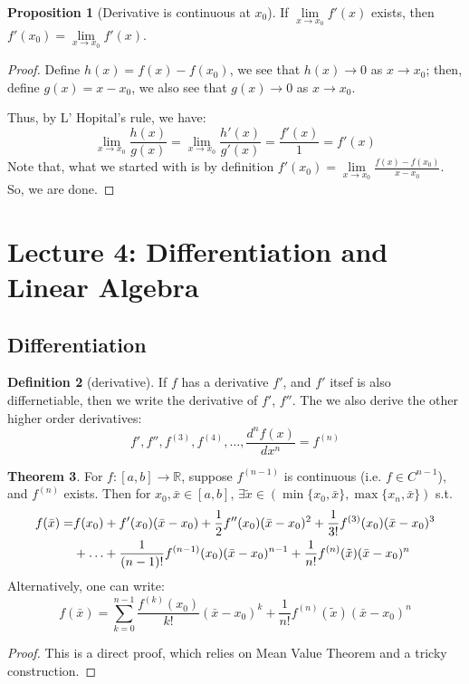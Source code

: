 \documentclass[12pt]{article}
\newcommand{\R}{{\mathbb R}}
\theoremstyle{definition}
\newtheorem{theorem}{Theorem}[section]
\newtheorem{definition}[theorem]{Definition}
\newtheorem{proposition}[theorem]{Proposition}
\theoremstyle{plain}
\begin{document}
\begin{proposition}
    [Derivative is continuous at $x_0$]
    If $\underset{x \to x_0} \lim f'(x)$ exists, then $f'(x_0) = \underset{x \to 
    x_0} \lim
    f'(x)$.

    \begin{proof}
        Define $h(x) = f(x) - f(x_0)$, we see that $h(x) \to 0$ as $x \to x_0$; 
        then, define $g(x) = x - x_0$, we also see that $g(x) \to 0$ as $x \to 
        x_0$. 
        
        Thus, by L' Hopital's rule, we have: 
        \[
            \underset{x \to x_0} \lim \frac{h(x)}{g(x)} = \underset{x \to x_0}  
            \lim
            \frac{h'(x)}{g'(x)} = \frac{f'(x)}{ 1} = f'(x)
        \]
        Note that, what we started with is by definition $f'(x_0) = \underset{x 
        \to x_0} \lim \frac{f(x) - f(x_0)}{ x - x_0}$. So, we are done.
    \end{proof}
\end{proposition}

\section{Lecture 4: Differentiation and Linear Algebra}

\subsection{Differentiation}

\begin{definition}
    [derivative]
    If $f$ has a derivative $f'$, and $f'$ itsef is also differnetiable, then we 
    write the derivative of $f'$, $f''$. The we also derive the other higher 
    order derivatives: 
    \[
        f', f'', f^{(3)}, f^{(4)}, \ldots, \frac{d ^n f(x)}{d x^n} = f^{(n)}
    \]
\end{definition}

\begin{theorem}
    For $f:[a,b] \to \R$, suppose $f^{(n-1)}$ is continuous (i.e. $f\in 
    C^{n-1}$), and $f^{(n)}$ exists. Then for $x_0, \bar x \in [a,b]$, $\exists 
    \tilde x \in \left( \min\{x_0, \bar x\}, \max \{ x_n, \bar x \} \right)$ 
    s.t. 
    \[
        \aligned
        f(\bar x ) = & f(x_0) + f'(x_0) ( \bar  x- x_0) + \frac{1}{2} f''(x_0) 
        (\bar x - x_0)^2 + \frac{1}{3!} f^{(3)} (x_0) (\bar x - x_0)^3 \\
        & + \ldots  + \frac{1}{(n-1)!} f^{(n-1)} (x_0) (\bar x - x_0) ^ {n-1} + 
        \frac{1}{n!} f^{(n)}(\tilde x)(\bar x - x_0)^n
        \endaligned
    \]
    Alternatively, one can write: 
    \[
        f(\bar x) = \sum_{k=0}^{n-1} \frac{f^{(k)}(x_0)}{k!}(\bar x - x_0)^k + 
        \frac{1}{n!}f^{(n)}(\tilde x) (\bar x - x_0)^n
    \]
    \begin{proof}
        This is a direct proof, which relies on Mean Value Theorem and a tricky 
        construction.
    \end{proof}
\end{theorem}
\end{document}
